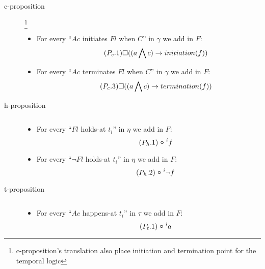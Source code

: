 \begin{description}
  \item[c-proposition]\footnote{c-proposition's translation also place initiation and termination point for the temporal logic}
  \begin{itemize}
    \item For every “$Ac$ initiates $Fl$ when $C$” in $\gamma$ we add in $F$:
    \begin{equation}\tag{$P_c.1$}
      \square((a\bigwedge c)\rightarrow initiation(f))
    \end{equation}
    \item For every “$Ac$ terminates $Fl$ when $C$” in $\gamma$ we add in $F$:
    \begin{equation}\tag{$P_c.3$}
      \square((a\bigwedge c)\rightarrow termination(f))
    \end{equation}
  \end{itemize}
  \item[h-proposition] $ $
  \begin{itemize}
    \item For every “$Fl$ holds-at $t_i$” in $\eta$ we add in $F$:
    \begin{equation}\tag{$P_h.1$}
      \next^{i}f
    \end{equation}
    \item For every “$\neg Fl$ holds-at $t_i$” in $\eta$ we add in $F$:
    \begin{equation}\tag{$P_h.2$}
      \next^{i} \neg f
    \end{equation}
  \end{itemize}
  \item[t-proposition] $ $
  \begin{itemize}
    \item For every “$Ac$ happens-at $t_i$” in $\tau$ we add in $F$:
    \begin{equation}\tag{$P_t.1$}
      \next^{i}a
    \end{equation}
  \end{itemize}
\end{description}

